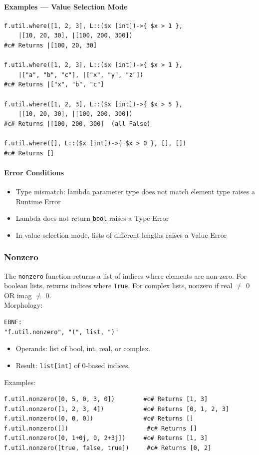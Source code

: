 \paragraph{Examples — Value Selection Mode}
\begin{verbatim}
f.util.where([1, 2, 3], L::($x [int])->{ $x > 1 },
    |[10, 20, 30], |[100, 200, 300])
#c# Returns |[100, 20, 30]

f.util.where([1, 2, 3], L::($x [int])->{ $x > 1 },
    |["a", "b", "c"], |["x", "y", "z"])
#c# Returns |["x", "b", "c"]

f.util.where([1, 2, 3], L::($x [int])->{ $x > 5 },
    |[10, 20, 30], |[100, 200, 300])
#c# Returns |[100, 200, 300]  (all False)

f.util.where([], L::($x [int])->{ $x > 0 }, [], [])
#c# Returns []
\end{verbatim}

\paragraph{Error Conditions}
\begin{itemize}
\item Type mismatch: lambda parameter type does not match element type raises a Runtime Error
\item Lambda does not return \texttt{bool} raises a Type Error
\item In value-selection mode, lists of different lengths raises a Value Error
\end{itemize}

\subsubsection{Nonzero}
The \texttt{nonzero} function returns a list of indices where elements are non-zero. For boolean lists, returns indices where \texttt{True}. For complex lists, nonzero if real $\neq$ 0 OR imag $\neq$ 0.\\
Morphology:
\begin{verbatim}
EBNF:
"f.util.nonzero", "(", list, ")"
\end{verbatim}
\begin{itemize}
\item Operands: list of bool, int, real, or complex.
\item Result: \texttt{list[int]} of 0-based indices.
\end{itemize}

Examples:
\begin{verbatim}
f.util.nonzero([0, 5, 0, 3, 0])        #c# Returns [1, 3]
f.util.nonzero([1, 2, 3, 4])           #c# Returns [0, 1, 2, 3]
f.util.nonzero([0, 0, 0])              #c# Returns []
f.util.nonzero([])                      #c# Returns []
f.util.nonzero([0, 1+0j, 0, 2+3j])     #c# Returns [1, 3]
f.util.nonzero([true, false, true])     #c# Returns [0, 2]
\end{verbatim}

